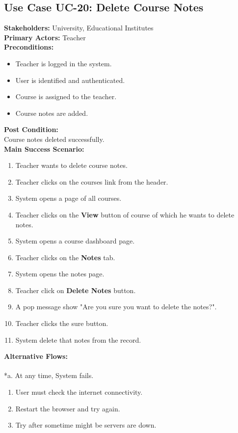 \subsection{Use Case UC-20: Delete Course Notes}
\textbf{Stakeholders: } University, Educational Institutes \\
\textbf{Primary Actors: }Teacher \\
\textbf{Preconditions:}
\begin{itemize}
\item Teacher is logged in the system.
\item User is identified and authenticated.
\item Course is assigned to the teacher.
\item Course notes are added.
\end{itemize}
\textbf{Post Condition: }\\
Course notes deleted successfully.\\
\textbf{Main Success Scenario:}
\begin{enumerate}
\item Teacher wants to delete course notes.
\item Teacher clicks on the courses link from the header.
\item System opens a page of all courses.
\item Teacher clicks on the \textbf{View} button of course of which he wants to delete notes.
\item System opens a course dashboard page.
\item Teacher clicks on the \textbf{Notes} tab.
\item System opens the notes page.
\item Teacher click on \textbf{Delete Notes} button.
\item A pop message show "Are you sure you want to delete the notes?".
\item Teacher clicks the sure button.
\item System delete that notes from the record.
\end{enumerate}
\textbf{Alternative Flows:}\\
\\
*a. At any time, System fails.
\begin{enumerate}
\item User must check the internet connectivity.
\item Restart the browser and try again.
\item Try after sometime might be servers are down.
\end{enumerate}
